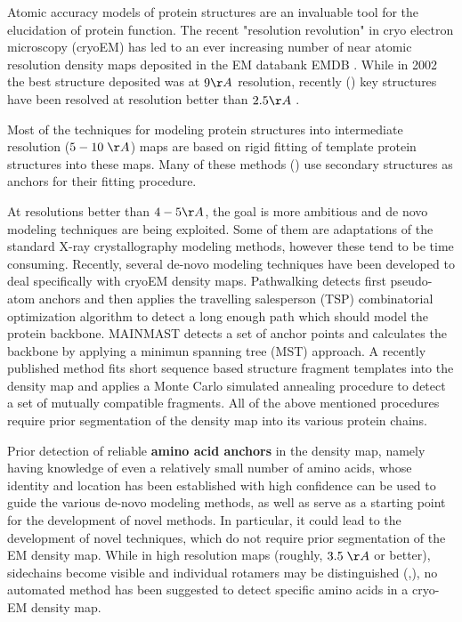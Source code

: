 Atomic accuracy models of protein structures are an invaluable tool for the elucidation of protein function.  The recent "resolution revolution" \cite{kuhlbrandt2014resolution} in cryo electron microscopy (cryoEM) has led to an ever increasing number of near atomic resolution density maps deposited in the EM databank EMDB \cite{Lawson2016EMDataBank3DEM}.  While in 2002 the best structure deposited was at $9 \AA$ resolution, recently (\cite{Bartesaghi20152.2Inhibitor,Banerjee20162.3Inhibition}) key structures have been resolved at resolution better than $2.5 \AA$ .

Most of the techniques for modeling protein structures into intermediate resolution ($5 - 10 \;\AA$) maps are based on rigid fitting of template protein structures into these maps.  Many of these methods (\cite{Jiang2001,lasker2007ematch,Yu2008,Rusu2012,Si2012}) use secondary structures as anchors for their fitting procedure. 

At resolutions better than $4-5 \AA$, the goal is more ambitious and de novo modeling techniques are being exploited. Some of them are adaptations of the standard X-ray crystallography modeling methods, however these tend to be time consuming. Recently, several de-novo modeling techniques have been developed to deal specifically with cryoEM density maps\cite{DiMaio2016}.  Pathwalking \cite{Chen2016} detects first pseudo-atom anchors and then applies the travelling salesperson (TSP) combinatorial optimization algorithm to detect a long enough path which should model the protein backbone. 
MAINMAST \cite{Terashi2018} detects a set of anchor points and calculates the backbone by applying  a minimun spanning tree (MST) approach.
A recently published method \cite{wang2015novo}  fits short sequence based structure fragment templates into the density map and applies a Monte Carlo simulated annealing procedure to detect a set of mutually compatible fragments.  All of the above mentioned procedures require prior segmentation of the density map into its various protein chains.

Prior detection of reliable {\bf amino acid anchors} in the density map, namely having knowledge of even a relatively small number of amino acids, whose identity and location has been established with high confidence 
can be used to guide the various de-novo modeling methods, as well as serve as a starting point for the development of novel methods. In particular, it could lead to the development of novel techniques, which do not require prior segmentation of the EM density map.   While in high resolution maps (roughly, $3.5 \;\AA$ or better), sidechains become  visible and individual rotamers may be distinguished (\cite{DiMaio2016},\cite{Cassidy2018}), no automated method has been suggested to detect specific amino acids in a cryo-EM density map.

